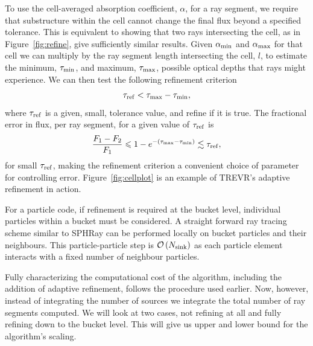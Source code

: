 \documentclass[fleq,usenatbib]{mnras}
\newcommand{\acro}{TREVR}
\newcommand{\bigO}[1]{\mathcal{O}\left(#1\right)}
\newcommand{\NK}{N_{\rm sink}}
\newcommand{\tr}{\tau_{\rm ref}}
\begin{document}
{To use the cell-averaged absorption coefficient, $\alpha$, for a ray segment,
we require that substructure within the cell cannot change the final flux
beyond a specified tolerance. This is equivalent to showing that two rays 
intersecting the cell, as in Figure~\ref{fig:refine}, give sufficiently 
similar results. Given $\alpha_{\rm min}$ and $\alpha_{\rm max}$ for that cell 
we can multiply by the ray segment length intersecting the cell, $l$, to 
estimate the minimum, $\tau_{\rm min}$, and maximum, $\tau_{\rm max}$, 
possible optical depths that rays might experience. We can then test the 
following refinement criterion
\begin{equation}
\label{eqn:refcrit}
\tr < \tau_{\rm max} - \tau_{\rm min},
\end{equation}
where $\tr$ is a given, small, tolerance value, and refine if it is true. The 
fractional error in flux, per ray segment, for a given value of $\tr$ is
\begin{equation}
\label{eqn:reffrac}
\frac{F_1 - F_2}{F_1} \leq 1 - e^{-(\tau_{\rm max}-\tau_{\rm min})} 
\lesssim \tr,
\end{equation}
for small $\tr$, making the refinement criterion a convenient choice of 
parameter for controlling error. Figure~\ref{fig:cellplot} is an example of 
\acro{}'s adaptive refinement in action.

For a particle code, if refinement is required at the bucket level, individual 
particles within a bucket must be considered.  A straight forward ray tracing 
scheme similar to SPHRay \citep{altayEt08} can be performed locally on bucket 
particles and their neighbours. This particle-particle step is $\bigO{\NK}$ as 
each particle element interacts with a fixed number of neighbour particles.

Fully characterizing the computational cost of the algorithm, including the 
addition of adaptive refinement, follows the procedure used earlier. Now, 
however, instead of integrating the number of sources we integrate the total 
number of ray segments computed. We will look at two cases, not refining at 
all and fully refining down to the bucket level. This will give us upper and 
lower bound for the algorithm's scaling.

}
\end{document}
